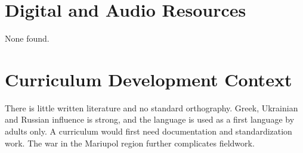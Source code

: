 \documentclass[12pt]{article}
\begin{document}
\section{Digital and Audio Resources}
None found.

\section{Curriculum Development Context}
There is little written literature and no standard orthography. Greek, Ukrainian and Russian influence is strong, and the language is used as a first language by adults only. A curriculum would first need documentation and standardization work. The war in the Mariupol region further complicates fieldwork.
\end{document}
